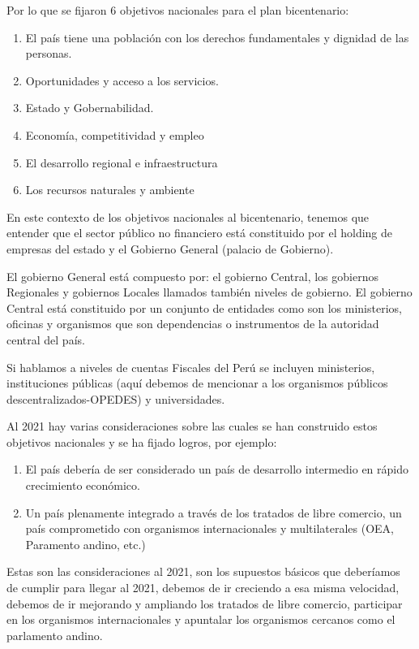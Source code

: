 \documentclass[
  a4paper,
]{article}
\providecommand{\tightlist}{%
  \setlength{\itemsep}{0pt}\setlength{\parskip}{0pt}}\usepackage{longtable,booktabs,array}
\begin{document}
Por lo que se fijaron 6 objetivos nacionales para el plan bicentenario:

\begin{enumerate}
\def\labelenumi{\arabic{enumi}.}
\tightlist
\item
  El país tiene una población con los derechos fundamentales y dignidad
  de las personas.
\item
  Oportunidades y acceso a los servicios.
\item
  Estado y Gobernabilidad.
\item
  Economía, competitividad y empleo
\item
  El desarrollo regional e infraestructura
\item
  Los recursos naturales y ambiente
\end{enumerate}

En este contexto de los objetivos nacionales al bicentenario, tenemos
que entender que el sector público no financiero está constituido por el
holding de empresas del estado y el Gobierno General (palacio de
Gobierno).

El gobierno General está compuesto por: el gobierno Central, los
gobiernos Regionales y gobiernos Locales llamados también niveles de
gobierno. El gobierno Central está constituido por un conjunto de
entidades como son los ministerios, oficinas y organismos que son
dependencias o instrumentos de la autoridad central del país.

Si hablamos a niveles de cuentas Fiscales del Perú se incluyen
ministerios, instituciones públicas (aquí debemos de mencionar a los
organismos públicos descentralizados-OPEDES) y universidades.

Al 2021 hay varias consideraciones sobre las cuales se han construido
estos objetivos nacionales y se ha fijado logros, por ejemplo:

\begin{enumerate}
\def\labelenumi{\arabic{enumi}.}
\tightlist
\item
  El país debería de ser considerado un país de desarrollo intermedio en
  rápido crecimiento económico.
\item
  Un país plenamente integrado a través de los tratados de libre
  comercio, un país comprometido con organismos internacionales y
  multilaterales (OEA, Paramento andino, etc.)
\end{enumerate}

Estas son las consideraciones al 2021, son los supuestos básicos que
deberíamos de cumplir para llegar al 2021, debemos de ir creciendo a esa
misma velocidad, debemos de ir mejorando y ampliando los tratados de
libre comercio, participar en los organismos internacionales y apuntalar
los organismos cercanos como el parlamento andino.
\end{document}

